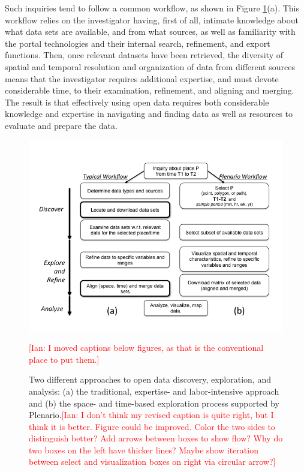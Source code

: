 \documentclass[11pt]{article}
\newcommand{\ian}[1]{\textcolor{Red}{[Ian: #1]}}
\newcommand{\ian}[1]{}
\begin{document}
Such inquiries tend to follow a common workflow, as shown in Figure \ref{fig:plenario-workflow}(a). This workflow relies on the investigator having, first of all, intimate knowledge about what data sets are available, and from what sources, as well as familiarity with the portal technologies and their internal search, refinement, and export functions. 
Then, once relevant datasets have been retrieved, the diversity of spatial and temporal resolution and organization of data from different sources means that the
investigator requires additional expertise, and must devote considerable time, to their examination, refinement, and aligning and merging. The result is that effectively using open data requires both considerable knowledge and expertise in navigating and finding data as well as resources to evaluate and prepare the data.

\begin{figure}
	\centering
	\includegraphics[scale=.5]{plenario_workflow.png}
		\label{fig:plenario-workflow}
	\caption{Two different approaches to open data discovery, exploration, and analysis: (a) the traditional, expertise- and labor-intensive approach and (b) the space- and time-based exploration process supported by Plenario.\ian{I don't think my revised caption is quite right, but I think it is better. Figure could be improved. Color the two sides to distinguish better?
	Add arrows between boxes to show flow? Why do two boxes on the left have thicker lines? Maybe show iteration between select and visualization boxes on right via circular arrow?}}\ian{I moved captions below figures, as that is the conventional place to put them.}
\end{figure}
\end{document}
